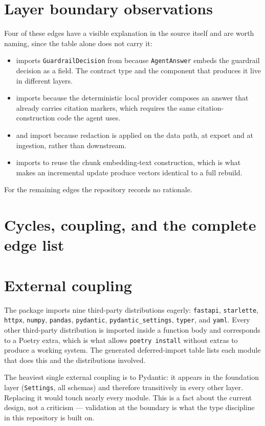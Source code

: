 \section{Layer boundary observations}
\label{sec:layer-violations}



Four of these edges have a visible explanation in the source itself and are
worth naming, since the table alone does not carry it:

\begin{itemize}
  \item {} imports \texttt{GuardrailDecision} from 
    because \texttt{AgentAnswer} embeds the guardrail decision as a field. The
    contract type and the component that produces it live in different layers.
  \item {} imports  because the deterministic local
    provider composes an answer that already carries citation markers, which
    requires the same citation-construction code the agent uses.
  \item {} and  import 
    because redaction is applied on the data path, at export and at ingestion,
    rather than downstream.
  \item {} imports  to reuse the chunk
    embedding-text construction, which is what makes an incremental update
    produce vectors identical to a full rebuild.
\end{itemize}

For the remaining edges the repository records no rationale.

\noevidence

\section{Cycles, coupling, and the complete edge list}



\section{External coupling}

The package imports nine third-party distributions eagerly: \texttt{fastapi},
\texttt{starlette}, \texttt{httpx}, \texttt{numpy}, \texttt{pandas},
\texttt{pydantic}, \texttt{pydantic\_settings}, \texttt{typer}, and
\texttt{yaml}. Every other third-party distribution is imported inside a
function body and corresponds to a Poetry extra, which is what allows
\texttt{poetry install} without extras to produce a working system. The
generated deferred-import table lists each module that does this and the
distributions involved.

The heaviest single external coupling is to Pydantic: it appears in the
foundation layer (\texttt{Settings}, all schemas) and therefore transitively in
every other layer. Replacing it would touch nearly every module. This is a
fact about the current design, not a criticism --- validation at the boundary
is what the type discipline in this repository is built on.
